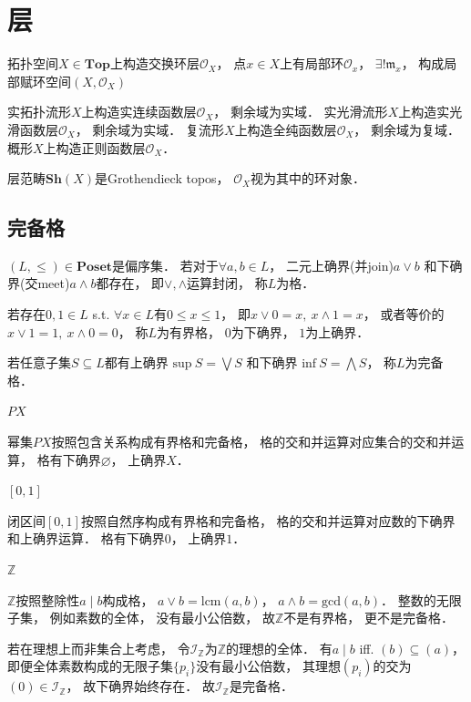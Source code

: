 \chapter{层}

拓扑空间$X \in\textbf{Top}$上构造交换环层$\mathcal O_X$，
点$x \in X$上有局部环$\mathcal O_x$，
$\exists! \mathfrak m_x$，
构成局部赋环空间$(X,\mathcal O_X)$

实拓扑流形$X$上构造实连续函数层$\mathcal O_X$，
剩余域为实域．
实光滑流形$X$上构造实光滑函数层$\mathcal O_X$，
剩余域为实域．
复流形$X$上构造全纯函数层$\mathcal O_X$，
剩余域为复域．
概形$X$上构造正则函数层$\mathcal O_X$．

层范畴$\textbf{Sh}(X)$是Grothendieck topos，
$\mathcal O_X$视为其中的环对象．


\section{完备格}

\begin{framed}

$(L,\leq) \in\textbf{Poset}$是偏序集．
若对于$\forall a,b \in L$，
二元上确界(并join)$a\vee b$
和下确界(交meet)$a\wedge b$都存在，
即$\vee,\wedge$运算封闭，
称$L$为格．

若存在$0,1 \in L$ s.t.
$\forall x \in L$有$0 \leq x \leq 1$，
即$x \vee 0 = x,\ x \wedge 1 = x$，
或者等价的$x \vee 1 = 1,\ x \wedge 0 = 0$，
称$L$为有界格，
$0$为下确界，
$1$为上确界．

若任意子集$S \subseteq L$都有上确界
$\text{sup} \ S = \bigvee S$
和下确界
$\text{inf} \ S = \bigwedge S$，
称$L$为完备格．

\end{framed}

\begin{example}{$PX$}

幂集$PX$按照包含关系构成有界格和完备格，
格的交和并运算对应集合的交和并运算，
格有下确界$\varnothing$，
上确界$X$．

\end{example}

\begin{example}{$[0,1]$}

闭区间$[0,1]$按照自然序构成有界格和完备格，
格的交和并运算对应数的下确界和上确界运算．
格有下确界$0$，
上确界$1$．

\end{example}

\begin{example}{$\mathbb Z$}

$\mathbb Z$按照整除性$a \mid b$构成格，
$a \vee b = \text{lcm}(a,b)$，
$a \wedge b = \text{gcd}(a,b)$．
整数的无限子集，
例如素数的全体，
没有最小公倍数，
故$\mathbb Z$不是有界格，
更不是完备格．

若在理想上而非集合上考虑，
令$\mathcal I_\mathbb Z$为$\mathbb Z$的理想的全体．
有$a \mid b$ iff. $(b) \subseteq (a)$，
即便全体素数构成的无限子集$\{p_i\}$没有最小公倍数，
其理想$(p_i)$的交为$(0) \in \mathcal I_\mathbb Z$，
故下确界始终存在．
故$\mathcal I_\mathbb Z$是完备格．

\end{example}

